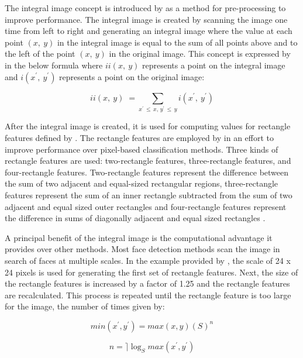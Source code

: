 The integral image concept is introduced by \cite{viola2004robust} as a method for pre-processing to improve performance. The integral image is created by scanning the image one time from left to right and generating an integral image where the value at each point $(x,\: y)$ in the integral image is equal to the sum of all points above and to the left of the point $(x,\: y)$ in the original image. This concept is expressed by \cite{viola2004robust} in the below formula where $ ii(x, \: y) $ represents a point on the integral image and $ i(x^\prime, \: y^\prime) $ represents a point on the original image:

\begin{equation}
\label{eqn_integralImage1}
ii(x, \: y) \; = \sum\limits_{x^\prime \, \leq \, x,\, y^\prime \, \leq \, y} i(x^\prime,\: y^\prime)
\end{equation}

After the integral image is created, it is used for computing values for rectangle features defined by \cite{viola2004robust}. The rectangle features are employed by \cite{viola2004robust} in an effort to improve performance over pixel-based classification methods. Three kinds of rectangle features are used: two-rectangle features, three-rectangle features, and four-rectangle features. Two-rectangle features represent the difference between the sum of two adjacent and equal-sized rectangular regions, three-rectangle features represent the sum of an inner rectangle subtracted from the sum of two adjacent and equal sized outer rectangles and four-rectangle features represent the difference in sums of diagonally adjacent and equal sized rectangles \cite{viola2004robust}.

A principal benefit of the integral image is the computational advantage it provides over other methods. Most face detection methods scan the image in search of faces at multiple scales. In the example provided by \cite{viola2004robust}, the  scale of 24 x 24 pixels is used for generating the first set of rectangle features. Next, the size of the rectangle features is increased by a factor of 1.25 and the rectangle features are recalculated. This process is repeated until the rectangle feature is too large for the image, the number of times given by:

\begin{equation}
\label{eqn_integralImage2}
min(x^\prime, y^\prime) = max(x, y) (S)^n
\end{equation}

\begin{equation}
\label{eqn_integralImage3}
n = \rceil{ \log_{S} max(x^\prime, y^\prime)}
\end{equation}

